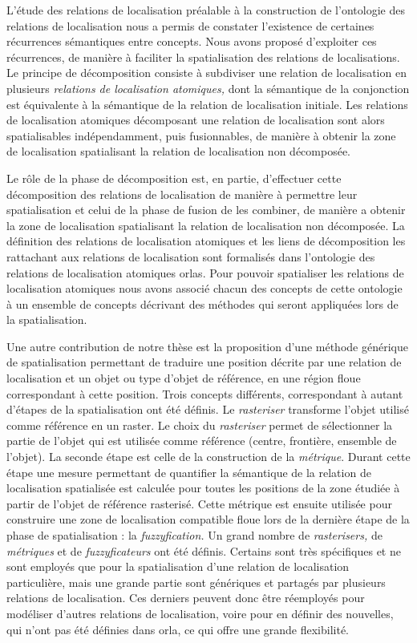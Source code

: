 L'étude des relations de localisation préalable à la construction de
l'ontologie des relations de localisation nous a permis de constater
l’existence de certaines récurrences sémantiques entre concepts. Nous
avons proposé d'exploiter ces récurrences, de manière à faciliter la
spatialisation des relations de localisations. Le principe de
décomposition consiste à subdiviser une relation de localisation en
plusieurs \emph{relations de localisation atomiques,} dont la
sémantique de la conjonction est équivalente à la sémantique de la
relation de localisation initiale. Les relations de localisation
atomiques décomposant une relation de localisation sont alors
spatialisables indépendamment, puis fusionnables, de manière à obtenir
la zone de localisation spatialisant la relation de localisation non
décomposée.

Le rôle de la phase de décomposition est, en partie, d'effectuer cette
décomposition des relations de localisation de manière à permettre
leur spatialisation et celui de la phase de fusion de les combiner, de
manière a obtenir la zone de localisation spatialisant la relation de
localisation non décomposée. La définition des relations de
localisation atomiques et les liens de décomposition les rattachant
aux relations de localisation sont formalisés dans l'ontologie des
relations de localisation atomiques \acp{orla}. Pour pouvoir
spatialiser les relations de localisation atomiques nous avons associé
chacun des concepts de cette ontologie à un ensemble de concepts
décrivant des méthodes qui seront appliquées lors de la
spatialisation.

Une autre contribution de notre thèse est la proposition d'une méthode
générique de spatialisation permettant de traduire une position
décrite par une relation de localisation et un objet ou type d'objet
de référence, en une région floue correspondant à cette position.
Trois concepts différents, correspondant à autant d'étapes de la
spatialisation ont été définis. Le \emph{rasteriser} transforme
l'objet utilisé comme référence en un raster. Le choix du
\emph{rasteriser} permet de sélectionner la partie de l'objet qui est
utilisée comme référence (centre, frontière, ensemble de l'objet). La
seconde étape est celle de la construction de la
\emph{métrique}. Durant cette étape une mesure permettant de
quantifier la sémantique de la relation de localisation spatialisée
est calculée pour toutes les positions de la zone étudiée à partir de
l'objet de référence rasterisé. Cette métrique est ensuite utilisée
pour construire une zone de localisation compatible floue lors de la
dernière étape de la phase de spatialisation : la
\emph{fuzzyfication.}  Un grand nombre de \emph{rasterisers,} de
\emph{métriques} et de \emph{fuzzyficateurs} ont été définis. Certains
sont très spécifiques et ne sont employés que pour la spatialisation
d'une relation de localisation particulière, mais une grande partie
sont génériques et partagés par plusieurs relations de
localisation. Ces derniers peuvent donc être réemployés pour modéliser
d'autres relations de localisation, voire pour en définir des
nouvelles, qui n'ont pas été définies dans \ac{orla}, ce qui offre une
grande flexibilité.

